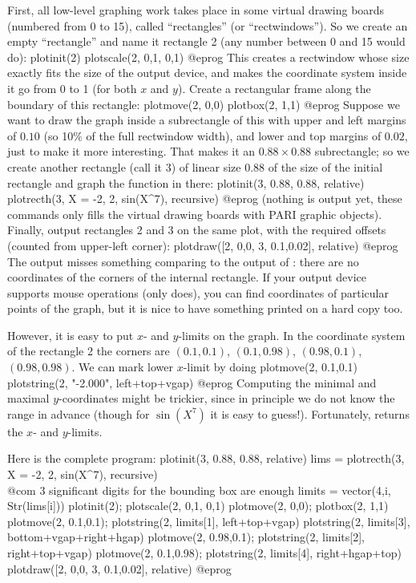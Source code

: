 First, all low-level graphing work takes place in some virtual drawing
boards (numbered from 0 to 15), called ``rectangles'' (or ``rectwindows'').
So we create an empty ``rectangle'' and name it rectangle 2 (any
number between 0 and 15 would do):
\bprog
  plotinit(2)
  plotscale(2, 0,1, 0,1)
@eprog
This creates a rectwindow whose size exactly fits the size of the output
device, and makes the coordinate system inside it go from 0 to 1 (for both
$x$ and $y$). Create a rectangular frame along the boundary of this rectangle:
\bprog
  plotmove(2, 0,0)
  plotbox(2, 1,1)
@eprog
Suppose we want to draw the graph inside a subrectangle of this with upper
and left margins of $0.10$ (so 10\% of the full rectwindow width), and
lower and top margins of $0.02$, just to make it more interesting. That
makes it an $0.88 \times 0.88$ subrectangle; so we create another rectangle
(call it 3) of linear size 0.88 of the size of the initial rectangle and
graph the function in there:
\bprog
  plotinit(3, 0.88, 0.88, relative)
  plotrecth(3, X = -2, 2, sin(X^7), recursive)
@eprog
(nothing is output yet, these commands only fills the virtual drawing
boards with PARI graphic objects). Finally, output rectangles 2 and 3 on
the same plot, with the required offsets (counted from upper-left corner):
\bprog
  plotdraw([2, 0,0,  3, 0.1,0.02], relative)
@eprog
\noindent The output misses something comparing to the output of
: there are no coordinates of the corners of the internal
rectangle.  If your output device supports mouse operations (only
 does), you can find coordinates of particular points of the
graph, but it is nice to have something printed on a hard copy too.

However, it is easy to put $x$- and $y$-limits on the graph.  In the
coordinate system of the rectangle 2 the corners are $(0.1,0.1)$,
$(0.1,0.98)$, $(0.98,0.1)$, $(0.98,0.98)$.  We can mark lower $x$-limit by
doing
\bprog
  plotmove(2, 0.1,0.1)
  plotstring(2, "-2.000", left+top+vgap)
@eprog\noindent
Computing the minimal and maximal $y$-coordinates might be trickier, since
in principle we do not know the range in advance (though for $\sin(X^7)$ it
is easy to guess!). Fortunately,  returns the $x$- and
$y$-limits.

Here is the complete program:
\bprog
  plotinit(3, 0.88, 0.88, relative)
  lims = plotrecth(3, X = -2, 2, sin(X^7), recursive)
            \\ @com $3$ significant digits for the bounding box are enough
  limits = vector(4,i, Str(lims[i]))
  plotinit(2);      plotscale(2, 0,1, 0,1)
  plotmove(2, 0,0); plotbox(2, 1,1)
  plotmove(2, 0.1,0.1);
  plotstring(2, limits[1], left+top+vgap)
  plotstring(2, limits[3], bottom+vgap+right+hgap)
  plotmove(2, 0.98,0.1); plotstring(2, limits[2], right+top+vgap)
  plotmove(2, 0.1,0.98); plotstring(2, limits[4], right+hgap+top)
  plotdraw([2, 0,0,  3, 0.1,0.02], relative)
@eprog

